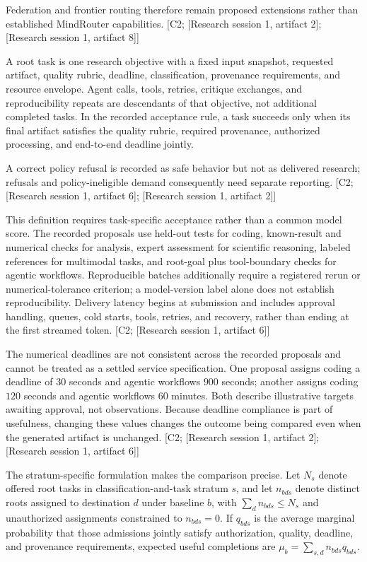 \documentclass[11pt]{article}
\begin{document}
Federation and frontier routing therefore remain proposed extensions rather than established MindRouter capabilities. [C2; [Research session 1, artifact 2]; [Research session 1, artifact 8]]

A root task is one research objective with a fixed input snapshot, requested artifact, quality rubric, deadline, classification, provenance requirements, and resource envelope. Agent calls, tools, retries, critique exchanges, and reproducibility repeats are descendants of that objective, not additional completed tasks. In the recorded acceptance rule, a task succeeds only when its final artifact satisfies the quality rubric, required provenance, authorized processing, and end-to-end deadline jointly.

A correct policy refusal is recorded as safe behavior but not as delivered research; refusals and policy-ineligible demand consequently need separate reporting. [C2; [Research session 1, artifact 6]; [Research session 1, artifact 2]]

This definition requires task-specific acceptance rather than a common model score. The recorded proposals use held-out tests for coding, known-result and numerical checks for analysis, expert assessment for scientific reasoning, labeled references for multimodal tasks, and root-goal plus tool-boundary checks for agentic workflows. Reproducible batches additionally require a registered rerun or numerical-tolerance criterion; a model-version label alone does not establish reproducibility. Delivery latency begins at submission and includes approval handling, queues, cold starts, tools, retries, and recovery, rather than ending at the first streamed token. [C2; [Research session 1, artifact 6]]

The numerical deadlines are not consistent across the recorded proposals and cannot be treated as a settled service specification. One proposal assigns coding a deadline of $30$ seconds and agentic workflows $900$ seconds; another assigns coding $120$ seconds and agentic workflows $60$ minutes. Both describe illustrative targets awaiting approval, not observations. Because deadline compliance is part of usefulness, changing these values changes the outcome being compared even when the generated artifact is unchanged. [C2; [Research session 1, artifact 2]; [Research session 1, artifact 6]]

The stratum-specific formulation makes the comparison precise. Let $N_s$ denote offered root tasks in classification-and-task stratum $s$, and let $n_{bds}$ denote distinct roots assigned to destination $d$ under baseline $b$, with $\sum_d n_{bds}\leq N_s$ and unauthorized assignments constrained to $n_{bds}=0$. If $q_{bds}$ is the average marginal probability that those admissions jointly satisfy authorization, quality, deadline, and provenance requirements, expected useful completions are $\mu_b=\sum_{s,d}n_{bds}q_{bds}$.
\end{document}
